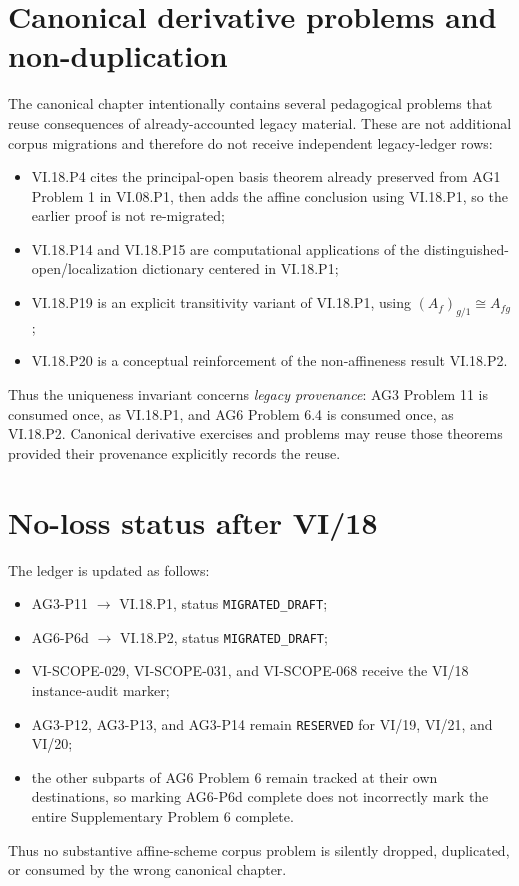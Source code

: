 \section*{Canonical derivative problems and non-duplication}
The canonical chapter intentionally contains several pedagogical problems that reuse consequences
of already-accounted legacy material.  These are not additional corpus migrations and therefore do
not receive independent legacy-ledger rows:
\begin{itemize}
\item VI.18.P4 cites the principal-open basis theorem already preserved from AG1 Problem 1 in
VI.08.P1, then adds the affine conclusion using VI.18.P1, so the earlier proof is not re-migrated;
\item VI.18.P14 and VI.18.P15 are computational applications of the distinguished-open/localization
dictionary centered in VI.18.P1;
\item VI.18.P19 is an explicit transitivity variant of VI.18.P1, using
$(A_f)_{g/1}\cong A_{fg}$;
\item VI.18.P20 is a conceptual reinforcement of the non-affineness result VI.18.P2.
\end{itemize}
Thus the uniqueness invariant concerns \emph{legacy provenance}: AG3 Problem 11 is consumed once,
as VI.18.P1, and AG6 Problem 6.4 is consumed once, as VI.18.P2.  Canonical derivative exercises
and problems may reuse those theorems provided their provenance explicitly records the reuse.

\section*{No-loss status after VI/18}
The ledger is updated as follows:
\begin{itemize}
\item AG3-P11 $\to$ VI.18.P1, status \texttt{MIGRATED\_DRAFT};
\item AG6-P6d $\to$ VI.18.P2, status \texttt{MIGRATED\_DRAFT};
\item VI-SCOPE-029, VI-SCOPE-031, and VI-SCOPE-068 receive the VI/18 instance-audit marker;
\item AG3-P12, AG3-P13, and AG3-P14 remain \texttt{RESERVED} for VI/19, VI/21, and VI/20;
\item the other subparts of AG6 Problem 6 remain tracked at their own destinations, so
marking AG6-P6d complete does not incorrectly mark the entire Supplementary Problem 6 complete.
\end{itemize}

Thus no substantive affine-scheme corpus problem is silently dropped, duplicated, or consumed
by the wrong canonical chapter.
